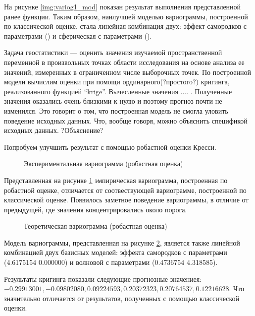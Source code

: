 На рисунке \ref{img:variog1_mod} показан результат выполнения представленной ранее функции. Таким образом, наилучшей моделью вариограммы, построенной по классической оценке, стала линейная комбинация двух: эффект самородков с параметрами () и сферическая с параметрами ().

Задача геостатистики --- оценить значения изучаемой пространственной переменной в произвольных точках области исследования на основе анализа ее значений, измеренных в ограниченном числе выборочных точек. По построенной модели вычислим оценки при помощи ординарного(?простого?) кригинга, реализованного функцией ``krige''. Вычесленные значения .... . Полученные значения оказались очень близкими к нулю и поэтому прогноз почти не изменился. Это говорит о том, что построенная модель не смогла уловить поведение исходных данных. Что, вообще говоря, можно объяснить спецификой исходных данных. ?Объяснение?

Попробуем улучшить результат с помощью робастной оценки Кресси.

\begin{figure}[ht]
\caption{Экспериментальная вариограмма (робастная оценка)}
\label{img:variog2_emp}
\end{figure}

Представленная на рисунке \ref{img:variog2_emp} эмпирическая вариограмма, построенная по робастной оценке, отличается от соотвествующей вариограмме, построенной по классической оценке. Появилось заметное поведение вариограммы, в отличие от предыдущей, где значения концентрировались около порога.

\begin{figure}[ht]
\caption{Теоретическая вариограмма (робастная оценка)}
\label{img:variog2_mod}
\end{figure}

Модель вариограммы, представленная на рисунке \ref{img:variog2_mod}, является также линейной комбинацией двух базисных моделей: эффекта самородков с параметрами (4.6175154 0.000000) и волновой с параметрами (0.4736754 4.318585).

Результаты кригинга показали следующие прогнозные значениея: $-0.29913001, -0.09802080, 0.09224593, 0.20372323, 0.20764537, 0.12216628$. Что значительно отличается от результатов, полученных с помощью классической оценки.


